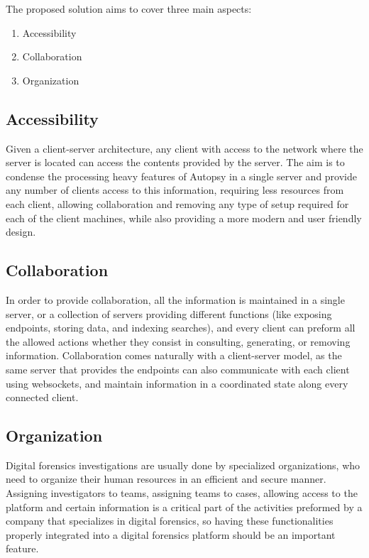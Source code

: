 The proposed solution aims to cover three main aspects:
\begin{enumerate}
 \item Accessibility
 \item Collaboration
 \item Organization 
\end{enumerate}

\subsection{Accessibility}

Given a client-server architecture, any client with access to the network where the server is located can access the contents provided by the server.
The aim is to condense the processing heavy features of Autopsy in a single server and provide any number of clients access to this information, requiring less 
resources from each client, allowing collaboration and removing any type of setup required for each of the client machines, while also providing a more modern 
and user friendly design.

\subsection{Collaboration}

In order to provide collaboration, all the information is maintained in a single server, or a collection of servers providing different functions (like exposing endpoints,
storing data, and indexing searches), and every client can preform all the allowed actions whether they consist in consulting, generating, or removing information. 
Collaboration comes naturally with a client-server model, as the same server that provides the endpoints can also communicate with each client using websockets, and maintain 
information in a coordinated state along every connected client.

\subsection{Organization}

Digital forensics investigations are usually done by specialized organizations, who need to organize their human resources in an efficient and secure manner.
Assigning investigators to teams, assigning teams to cases, allowing access to the platform and certain information is a critical part of the activities preformed by
a company that specializes in digital forensics, so having these functionalities properly integrated into a digital forensics platform should be an important feature.
